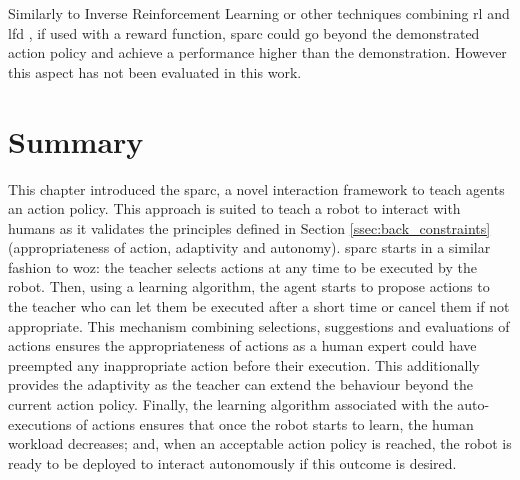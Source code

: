 Similarly to Inverse Reinforcement Learning \citep{abbeel2004apprenticeship} or other techniques combining \gls{rl} and \gls{lfd} \citep{billard2008robot}, if used with a reward function, \gls{sparc} could go beyond the demonstrated action policy and achieve a performance higher than the demonstration. However this aspect has not been evaluated in this work.

\section{Summary}
    
This chapter introduced the \acrfull{sparc}, a novel interaction framework to teach agents an action policy. This approach is suited to teach a robot to interact with humans as it validates the principles defined in Section \ref{ssec:back_constraints} (appropriateness of action, adaptivity and autonomy). \gls{sparc} starts in a similar fashion to \gls{woz}: the teacher selects actions at any time to be executed by the robot. Then, using a learning algorithm, the agent starts to propose actions to the teacher who can let them be executed after a short time or cancel them if not appropriate. This mechanism combining selections, suggestions and evaluations of actions ensures the appropriateness of actions as a human expert could have preempted any inappropriate action before their execution. This additionally provides the adaptivity as the teacher can extend the behaviour beyond the current action policy. Finally, the learning algorithm associated with the auto-executions of actions ensures that once the robot starts to learn, the human workload decreases; and, when an acceptable action policy is reached, the robot is ready to be deployed to interact autonomously if this outcome is desired.

